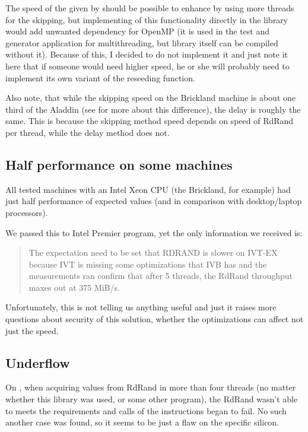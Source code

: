 \par{
The speed of the given by  should be possible to enhance by using more threads for the skipping, but implementing of this functionality directly in the library would add unwanted dependency for OpenMP (it is used in the test and generator application for multithreading, but library itself can be compiled without it). Because of this, I decided to do not implement it and just note it here that if someone would need higher speed, he or she will probably need to implement its own variant of the reseeding function.
}

\par{
Also note, that while the skipping speed on the Brickland machine is about one third of the Aladdin (see  for more about this difference), the delay is roughly the same. This is because the skipping method speed depends on speed of RdRand per thread, while the delay method does not.
}

\subsection{Half performance on some machines}\label{subsec:testing:halfPerf}

\par{All tested machines with an Intel Xeon CPU (the Brickland, for example) had just half performance of expected values (and in comparison with desktop/laptop processors).
}

\par{
We passed this to Intel Premier program, yet the only information we received is:
\begin{quote}
The expectation need to be set that RDRAND is slower on IVT-EX 
because IVT is missing some optimizations that IVB has 
and the measurements ran confirm that after 5 threads, 
the RdRand throughput maxes out at 375 MiB/s.
\end{quote}
Unfortunately, this is not telling us anything useful and just it raises more 
questions about security of this solution, whether the optimizations can affect not just the speed.
}

\subsection{Underflow}
\par{
On , when acquiring values from RdRand in more than four threads (no matter whether this library was used, or some other program), the RdRand wasn't able to meets the requirements and calls of the instructions began to fail. No such another case was found, so it seems to be just a flaw on the specific silicon.
}

